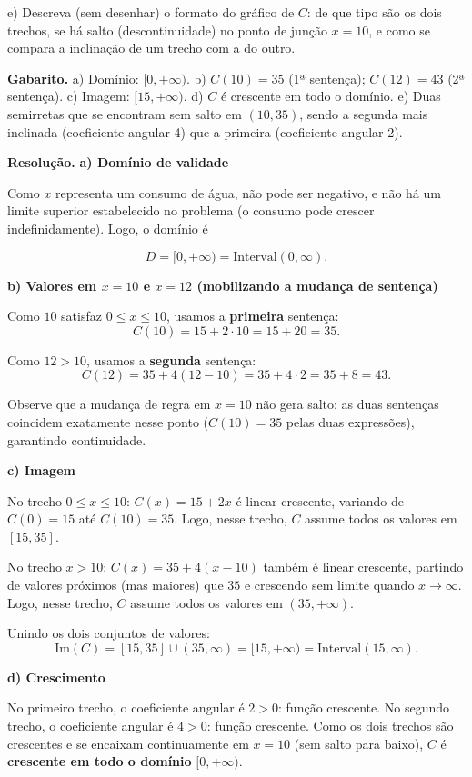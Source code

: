 \documentclass[11pt,a4paper]{article}
\begin{document}
e) Descreva (sem desenhar) o formato do gráfico de $C$: de que tipo são os dois trechos, se há salto (descontinuidade) no ponto de junção $x=10$, e como se compara a inclinação de um trecho com a do outro.

\textbf{Gabarito.} a) Domínio: $[0,+\infty)$. b) $C(10)=35$ (1ª sentença); $C(12)=43$ (2ª sentença). c) Imagem: $[15,+\infty)$. d) $C$ é crescente em todo o domínio. e) Duas semirretas que se encontram sem salto em $(10,35)$, sendo a segunda mais inclinada (coeficiente angular 4) que a primeira (coeficiente angular 2).

\textbf{Resolução.} \textbf{a) Domínio de validade}

Como $x$ representa um consumo de água, não pode ser negativo, e não há um limite superior estabelecido no problema (o consumo pode crescer indefinidamente). Logo, o domínio é

$$D = [0, +\infty) = \text{Interval}(0,\infty).$$

\textbf{b) Valores em $x=10$ e $x=12$ (mobilizando a mudança de sentença)}

Como $10$ satisfaz $0 \le x \le 10$, usamos a \textbf{primeira} sentença:
$$C(10) = 15 + 2\cdot 10 = 15 + 20 = 35.$$

Como $12 > 10$, usamos a \textbf{segunda} sentença:
$$C(12) = 35 + 4(12-10) = 35 + 4\cdot 2 = 35 + 8 = 43.$$

Observe que a mudança de regra em $x=10$ não gera salto: as duas sentenças coincidem exatamente nesse ponto ($C(10)=35$ pelas duas expressões), garantindo continuidade.

\textbf{c) Imagem}

No trecho $0 \le x \le 10$: $C(x) = 15+2x$ é linear crescente, variando de $C(0)=15$ até $C(10)=35$. Logo, nesse trecho, $C$ assume todos os valores em $[15,35]$.

No trecho $x>10$: $C(x) = 35+4(x-10)$ também é linear crescente, partindo de valores próximos (mas maiores) que $35$ e crescendo sem limite quando $x \to \infty$. Logo, nesse trecho, $C$ assume todos os valores em $(35, +\infty)$.

Unindo os dois conjuntos de valores:
$$\text{Im}(C) = [15,35] \cup (35,\infty) = [15,+\infty) = \text{Interval}(15,\infty).$$

\textbf{d) Crescimento}

No primeiro trecho, o coeficiente angular é $2>0$: função crescente.
No segundo trecho, o coeficiente angular é $4>0$: função crescente.
Como os dois trechos são crescentes e se encaixam continuamente em $x=10$ (sem salto para baixo), $C$ é \textbf{crescente em todo o domínio} $[0,+\infty)$.
\end{document}
